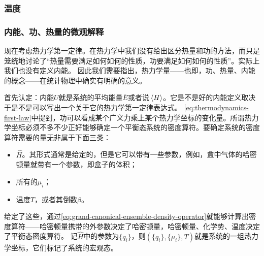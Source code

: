 \documentclass[hyperref, UTF8, a4paper]{ctexart}
\begin{document}
\subsubsection{温度}


\subsubsection{内能、功、热量的微观解释}\label{sec:head-work-energy-explained}

现在考虑热力学第一定律。在热力学中我们没有给出区分热量和功的方法，而只是笼统地讨论了“热量需要满足如何如何的性质，功要满足如何如何的性质”。实际上我们也没有定义内能。
因此我们需要指出，热力学量——也即，功、热量、内能的概念——在统计物理中确实有明确的意义。

首先认定：内能$U$就是系统的平均能量$\bar{E}$或者说$\expval*{H}$。它是不是好的内能定义取决于是不是可以写出一个关于它的热力学第一定律表达式。
\eqref{eq:thermodynamics-first-law}中提到，功可以看成某个广义力乘上某个热力学坐标的变化量。所谓热力学坐标必须不多不少正好能够确定一个平衡态系统的密度算符。要确定系统的密度算符需要的量无非属于下面三类：
\begin{itemize}
    \item $\hat{H}$。其形式通常是给定的，但是它可以带有一些参数，例如，盒中气体的哈密顿量就带有一个参数，即盒子的体积；
    \item 所有的$\mu_i$；
    \item 温度$T$，或者其倒数$\beta$。
\end{itemize}
给定了这些，通过\eqref{eq:grand-canonical-ensemble-density-operator}就能够计算出密度算符——哈密顿量携带的外参数决定了哈密顿量，哈密顿量、化学势、温度决定了平衡态密度算符。
记$\hat{H}$中的参数为$\{q_i\}$，则$(\{q_i\}, \{\mu_i\}, T)$就是系统的一组热力学坐标，它们标记了系统的宏观态。
\end{document}
